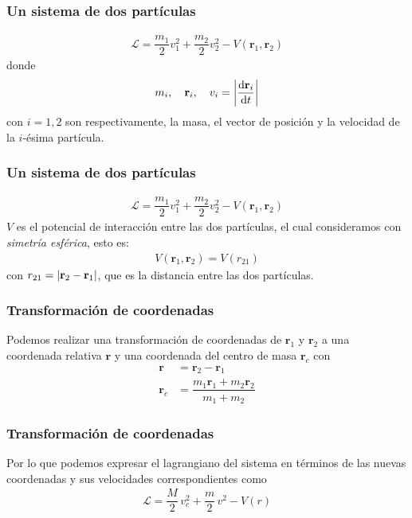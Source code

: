 \begin{frame}
\frametitle{Un sistema de dos partículas}
\begin{align*}
\mathcal{L} = \dfrac{m_{1}}{2} v_{1}^{2} + \dfrac{m_{2}}{2} v_{2}^{2} - V(\mathbf{r}_{1}, \mathbf{r}_2)
\end{align*}
donde 
\begin{align*}
m_{i}, \quad \mathbf{r}_{i}, \quad v_{i} = \abs{\dv{\mathbf{r}_{i}}{t}}
\end{align*}
con $i = 1, 2$ son respectivamente, la masa, el vector de posición y la velocidad de la $i$-ésima partícula.
\end{frame}
\begin{frame}
\frametitle{Un sistema de dos partículas}
\begin{align*}
\mathcal{L} = \dfrac{m_{1}}{2} v_{1}^{2} + \dfrac{m_{2}}{2} v_{2}^{2} - V(\mathbf{r}_{1}, \mathbf{r}_2)
\end{align*}
$V$ es el potencial de interacción entre las dos partículas, el cual consideramos con \emph{simetría esférica}, esto es:
\begin{align*}
V(\mathbf{r}_{1},\mathbf{r}_{2}) = V(r_{21})
\end{align*}
con $r_{21} = \abs{\mathbf{r}_{2} - \mathbf{r}_{1}}$, que es la distancia entre las dos partículas.
\end{frame}
\begin{frame}
\frametitle{Transformación de coordenadas}
Podemos realizar una transformación de coordenadas de $\mathbf{r}_{1}$ y $\mathbf{r}_{2}$ a una coordenada relativa $\mathbf{r}$ y una coordenada del centro de masa $\mathbf{r}_{c}$ con
\begin{align}
\mathbf{r} &= \mathbf{r}_{2} - \mathbf{r}_{1} \\[0.5em]
\mathbf{r}_{c} &= \dfrac{m_{1}\mathbf{r}_{1} + m_{2} \mathbf{r}_{2}}{m_{1} + m_{2}}
\end{align}
\end{frame}
\begin{frame}
\frametitle{Transformación de coordenadas}
Por lo que podemos expresar el lagrangiano del sistema en términos de las nuevas coordenadas y sus velocidades correspondientes como
\begin{align}
\mathcal{L} = \dfrac{M}{2} \, v_{c}^{2} + \dfrac{m}{2} \, v^{2} - V(r)
\end{align}
\end{frame}

